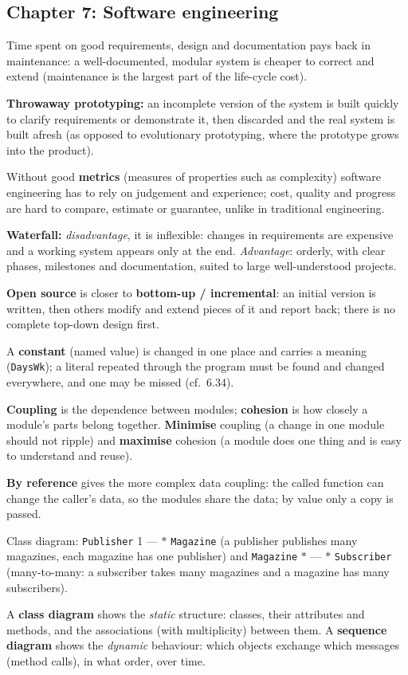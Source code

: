 \documentclass{fkt-notes}
\begin{document}
\subsection*{Chapter 7: Software engineering}
\begin{description}[leftmargin=0pt,labelindent=0pt,itemsep=2pt]
  \item[7.1] Time spent on good requirements, design and documentation pays back in maintenance: a well-documented, modular system is cheaper to correct and extend (maintenance is the largest part of the life-cycle cost).
  \item[7.2] \textbf{Throwaway prototyping:} an incomplete version of the system is built quickly to clarify requirements or demonstrate it, then discarded and the real system is built afresh (as opposed to evolutionary prototyping, where the prototype grows into the product).
  \item[7.3] Without good \textbf{metrics} (measures of properties such as complexity) software engineering has to rely on judgement and experience; cost, quality and progress are hard to compare, estimate or guarantee, unlike in traditional engineering.
  \item[7.7] \textbf{Waterfall:} \emph{disadvantage}, it is inflexible: changes in requirements are expensive and a working system appears only at the end. \emph{Advantage}: orderly, with clear phases, milestones and documentation, suited to large well-understood projects.
  \item[7.8] \textbf{Open source} is closer to \textbf{bottom-up / incremental}: an initial version is written, then others modify and extend pieces of it and report back; there is no complete top-down design first.
  \item[7.9] A \textbf{constant} (named value) is changed in one place and carries a meaning (\texttt{DaysWk}); a literal repeated through the program must be found and changed everywhere, and one may be missed (cf.\ 6.34).
  \item[7.10] \textbf{Coupling} is the dependence between modules; \textbf{cohesion} is how closely a module's parts belong together. \textbf{Minimise} coupling (a change in one module should not ripple) and \textbf{maximise} cohesion (a module does one thing and is easy to understand and reuse).
  \item[7.13] \textbf{By reference} gives the more complex data coupling: the called function can change the caller's data, so the modules share the data; by value only a copy is passed.
  \item[7.20] Class diagram: \texttt{Publisher} 1 --- $*$ \texttt{Magazine} (a publisher publishes many magazines, each magazine has one publisher) and \texttt{Magazine} $*$ --- $*$ \texttt{Subscriber} (many-to-many: a subscriber takes many magazines and a magazine has many subscribers).
  \item[7.25] A \textbf{class diagram} shows the \emph{static} structure: classes, their attributes and methods, and the associations (with multiplicity) between them. A \textbf{sequence diagram} shows the \emph{dynamic} behaviour: which objects exchange which messages (method calls), in what order, over time.
\end{description}
\end{document}
